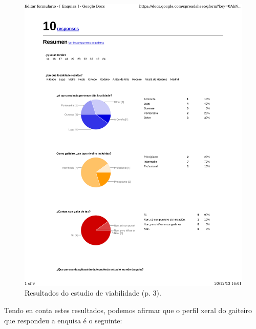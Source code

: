 \begin{figure}[htbp]
 \centering
 \includegraphics[trim=0 22cm 0 0,clip=true,scale=0.7,page=3,keepaspectratio=true,clip,trim=0cm 0.5cm 0cm 0.5cm]{./imagenes/enquisa.pdf}
 \caption{Resultados do estudio de viabilidade (p. 3).}
 \label{figura:ResultadosEstudioViabilidade3}
\end{figure}

Tendo en conta estes resultados, podemos afirmar que o perfil xeral do gaiteiro
que respondeu a enquisa é o seguinte:

